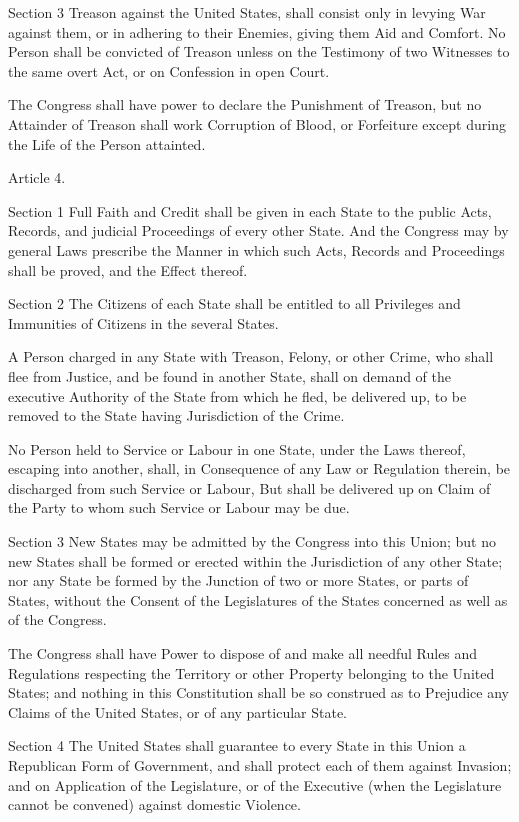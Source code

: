 \documentclass[12pt,a4paper]{article}
\begin{document}
Section 3
Treason against the United States, shall consist only in levying War against
them, or in adhering to their Enemies, giving them Aid and Comfort. No Person
shall be convicted of Treason unless on the Testimony of two Witnesses to the
same overt Act, or on Confession in open Court.

The Congress shall have power to declare the Punishment of Treason, but no
Attainder of Treason shall work Corruption of Blood, or Forfeiture except
during the Life of the Person attainted.

Article 4.

Section 1
Full Faith and Credit shall be given in each State to the public Acts, Records,
and judicial Proceedings of every other State. And the Congress may by general
Laws prescribe the Manner in which such Acts, Records and Proceedings shall be
proved, and the Effect thereof.

Section 2
The Citizens of each State shall be entitled to all Privileges and Immunities
of Citizens in the several States.

A Person charged in any State with Treason, Felony, or other Crime, who shall
flee from Justice, and be found in another State, shall on demand of the
executive Authority of the State from which he fled, be delivered up, to be
removed to the State having Jurisdiction of the Crime.

No Person held to Service or Labour in one State, under the Laws thereof,
escaping into another, shall, in Consequence of any Law or Regulation therein,
be discharged from such Service or Labour, But shall be delivered up on Claim
of the Party to whom such Service or Labour may be due.

Section 3
New States may be admitted by the Congress into this Union; but no new States
shall be formed or erected within the Jurisdiction of any other State; nor any
State be formed by the Junction of two or more States, or parts of States,
without the Consent of the Legislatures of the States concerned as well as of
the Congress.

The Congress shall have Power to dispose of and make all needful Rules and
Regulations respecting the Territory or other Property belonging to the United
States; and nothing in this Constitution shall be so construed as to Prejudice
any Claims of the United States, or of any particular State.

Section 4
The United States shall guarantee to every State in this Union a Republican
Form of Government, and shall protect each of them against Invasion; and on
Application of the Legislature, or of the Executive (when the Legislature
cannot be convened) against domestic Violence.
\end{document}

